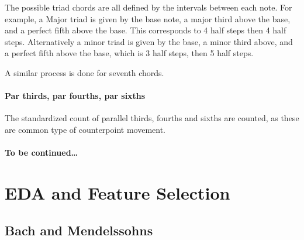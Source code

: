 \documentclass[12pt,twoside]{reedthesis}
\theoremstyle{definition}
\theoremstyle{definition}
\theoremstyle{definition}
\theoremstyle{remark}
\begin{document}
The possible triad chords are all defined by the intervals between each
note. For example, a Major triad is given by the base note, a major
third above the base, and a perfect fifth above the base. This
corresponds to 4 half steps then 4 half steps. Alternatively a minor
triad is given by the base, a minor third above, and a perfect fifth
above the base, which is 3 half steps, then 5 half steps.

A similar process is done for seventh chords.

\subsubsection{Par thirds, par fourths, par
sixths}\label{par-thirds-par-fourths-par-sixths}

The standardized count of parallel thirds, fourths and sixths are
counted, as these are common type of counterpoint movement.

\subsubsection{To be continued\ldots{}}\label{to-be-continued}

\chapter{EDA and Feature Selection}\label{eda-and-feature-selection}

\section{Bach and Mendelssohns}\label{bach-and-mendelssohns}
\end{document}

